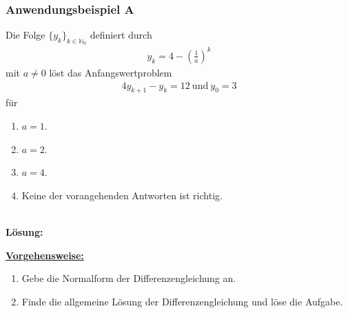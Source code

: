\subsubsection*{Anwendungsbeispiel A}
Die Folge $\lbrace y_k \rbrace_{k \in \mathbb{N}_0}$ definiert durch
\begin{align*}
y_k =  4 - \left( \frac{1}{a}\right)^k
\end{align*}
mit $a \neq 0$ löst das Anfangswertproblem
\begin{align*}
4 y_{k+1} -y_k = 12 \ \text{und} \ y_0 = 3
\end{align*}
für
\renewcommand{\labelenumi}{(\alph{enumi})}
\begin{enumerate}
\item 
$a= 1$.
\item
$a= 2$.
\item
$a= 4$.
\item
Keine der vorangehenden Antworten ist richtig.
\end{enumerate}
\ \\
\textbf{Lösung:}
\begin{mdframed}
\underline{\textbf{Vorgehensweise:}}
\renewcommand{\labelenumi}{\theenumi.}
\begin{enumerate}
\item Gebe die Normalform der Differenzengleichung an.
\item Finde die allgemeine Lösung der Differenzengleichung und löse die Aufgabe.
\end{enumerate}
\end{mdframed}


